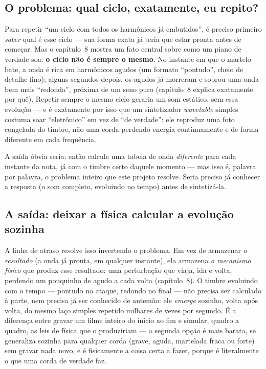 \documentclass[11pt,oneside]{book}
\begin{document}
\subsection*{O problema: qual ciclo, exatamente, eu repito?}

Para repetir \enquote{um ciclo com todos os harmônicos já embutidos}, é
preciso primeiro \emph{saber} qual é esse ciclo --- sua forma exata já
teria que estar pronta antes de começar. Mas o capítulo~8 mostra um fato
central sobre como um piano de verdade soa: \textbf{o ciclo não é sempre o
mesmo}. No instante em que o martelo bate, a onda é rica em harmônicos
agudos (um formato \enquote{pontudo}, cheio de detalhe fino); alguns
segundos depois, os agudos já morreram e sobrou uma onda bem mais
\enquote{redonda}, próxima de um seno puro (capítulo~8 explica exatamente
por quê). Repetir sempre o mesmo ciclo geraria um som estático, sem essa
evolução --- e é exatamente por isso que um sintetizador \emph{wavetable}
simples costuma soar \enquote{eletrônico} em vez de \enquote{de verdade}:
ele reproduz uma foto congelada do timbre, não uma corda perdendo energia
continuamente e de forma diferente em cada frequência.

A saída óbvia seria: então calcule uma tabela de onda \emph{diferente}
para cada instante da nota, já com o timbre certo daquele momento --- mas
isso é, palavra por palavra, o problema inteiro que este projeto resolve.
Seria preciso já conhecer a resposta (o som completo, evoluindo no tempo)
antes de sintetizá-la.

\subsection*{A saída: deixar a física calcular a evolução sozinha}

A linha de atraso resolve isso invertendo o problema. Em vez de armazenar
\emph{o resultado} (a onda já pronta, em qualquer instante), ela armazena
\emph{o mecanismo físico} que produz esse resultado: uma perturbação que
viaja, ida e volta, perdendo um pouquinho de agudo a cada volta
(capítulo~8). O timbre evoluindo com o tempo --- pontudo no ataque,
redondo no final --- não precisa ser calculado à parte, nem precisa já ser
conhecido de antemão: ele \emph{emerge} sozinho, volta após volta, do
mesmo laço simples repetido milhares de vezes por segundo. É a diferença
entre gravar um filme inteiro do início ao fim e simular, quadro a quadro,
as leis de física que o produziriam --- a segunda opção é mais barata, se
generaliza sozinha para qualquer corda (grave, aguda, martelada fraca ou
forte) sem gravar nada novo, e é fisicamente a coisa certa a fazer, porque
é literalmente o que uma corda de verdade faz.
\end{document}
